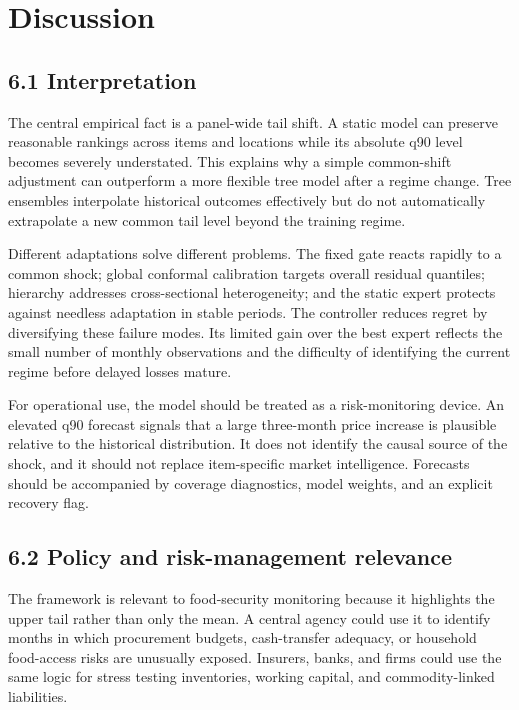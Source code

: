 \section{Discussion}\label{discussion}

\subsection{6.1 Interpretation}\label{interpretation}

The central empirical fact is a panel-wide tail shift. A static model
can preserve reasonable rankings across items and locations while its
absolute q90 level becomes severely understated. This explains why a
simple common-shift adjustment can outperform a more flexible tree model
after a regime change. Tree ensembles interpolate historical outcomes
effectively but do not automatically extrapolate a new common tail level
beyond the training regime.

Different adaptations solve different problems. The fixed gate reacts
rapidly to a common shock; global conformal calibration targets overall
residual quantiles; hierarchy addresses cross-sectional heterogeneity;
and the static expert protects against needless adaptation in stable
periods. The controller reduces regret by diversifying these failure
modes. Its limited gain over the best expert reflects the small number
of monthly observations and the difficulty of identifying the current
regime before delayed losses mature.

For operational use, the model should be treated as a risk-monitoring
device. An elevated q90 forecast signals that a large three-month price
increase is plausible relative to the historical distribution. It does
not identify the causal source of the shock, and it should not replace
item-specific market intelligence. Forecasts should be accompanied by
coverage diagnostics, model weights, and an explicit recovery flag.

\subsection{6.2 Policy and risk-management
relevance}\label{policy-and-risk-management-relevance}

The framework is relevant to food-security monitoring because it
highlights the upper tail rather than only the mean. A central agency
could use it to identify months in which procurement budgets,
cash-transfer adequacy, or household food-access risks are unusually
exposed. Insurers, banks, and firms could use the same logic for stress
testing inventories, working capital, and commodity-linked liabilities.

